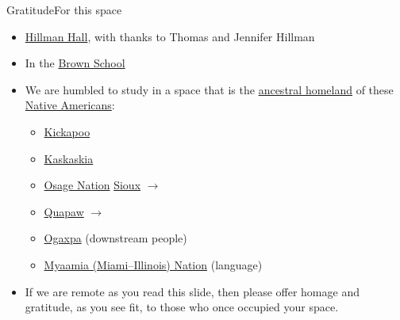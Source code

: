 \begin{frame}{Gratitude}{For this space}
\begin{itemize}
    \item \href{https://wustl.edu/about/campuses/danforth-campus/hillman-hall/}{Hillman Hall}, with thanks to Thomas and Jennifer Hillman
    \item In the \href{https://brownschool.wustl.edu/about/Pages/default.aspx}{Brown School}
    \item We are humbled to study in a space that is the \href{https://native-land.ca/resources/territory-acknowledgement/}{ancestral homeland} of these \href{https://en.wikipedia.org/wiki/Native_Americans_in_the_United_States}{Native Americans}:
    \begin{itemize}
        \item \href{https://en.wikipedia.org/wiki/Kickapoo_people}{Kickapoo}
        \item \href{https://en.wikipedia.org/wiki/Kaskaskia}{Kaskaskia}
        \item \href{https://en.wikipedia.org/wiki/Osage_Nation}{Osage Nation}
        \href{https://en.wikipedia.org/wiki/Sioux}{Sioux} $\rightarrow$
        \item \Indent{2em}\href{https://en.wikipedia.org/wiki/Quapaw}{Quapaw} $\rightarrow$
        \item \Indent{4em}\href{https://www.quapawtribe.com/401/Tribal-Name}{Ogaxpa} (downstream people)
        \item \href{https://en.wikipedia.org/wiki/Miami_people}{Myaamia (Miami--Illinois) Nation} (language)
        \end{itemize}
    \item If we are remote as you read this slide, then please offer homage and gratitude, as you see fit, to those who once occupied your space.
\end{itemize}
\end{frame}
